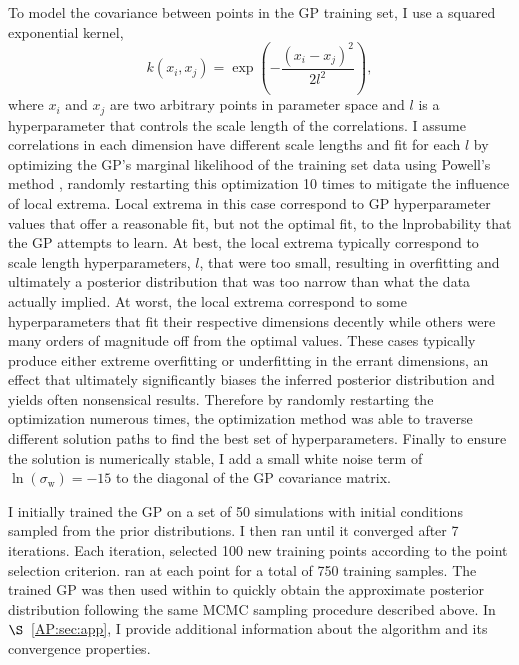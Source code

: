 To model the covariance between points in the GP training set, I use a squared exponential kernel,
\begin{equation} \label{trap:eqn:kernel}
k(x_i, x_j) = \exp \left( - \frac{(x_i - x_j)^2}{2l^2} \right),
\end{equation}
where $x_i$ and $x_j$ are two arbitrary points in parameter space and $l$ is a hyperparameter that controls the scale length of the correlations. I assume correlations in each dimension have different scale lengths and fit for each $l$ by optimizing the GP's marginal likelihood of the training set data using Powell's method \citep{Powell1964}, randomly restarting this optimization 10 times to mitigate the influence of local extrema. Local extrema in this case correspond to GP hyperparameter values that offer a reasonable fit, but not the optimal fit, to the lnprobability that the GP attempts to learn. At best, the local extrema typically correspond to scale length hyperparameters, $l$, that were too small, resulting in overfitting and ultimately a posterior distribution that was too narrow than what the data actually implied. At worst, the local extrema correspond to some hyperparameters that fit their respective dimensions decently while others were many orders of magnitude off from the optimal values. These cases typically produce either extreme overfitting or underfitting in the errant dimensions, an effect that ultimately significantly biases the inferred posterior distribution and yields often nonsensical results. Therefore by randomly restarting the optimization numerous times, the optimization method was able to traverse different solution paths to find the best set of hyperparameters. Finally to ensure the solution is numerically stable, I add a small white noise term of $\ln(\sigma_{\mathrm{w}}) = -15$ to the diagonal of the GP covariance matrix. 

I initially trained the GP on a set of 50 \vplanet simulations with initial conditions sampled from the prior distributions. I then ran \approxposterior until it converged after 7 iterations. Each iteration, \approxposterior selected 100 new training points according to the \citet{Kandasamy2017} point selection criterion. \approxposterior ran \vplanet at each point for a total of 750 training samples. The trained GP was then used within \emcee to quickly obtain the approximate posterior distribution following the same MCMC sampling procedure described above. In $\S$~\ref{AP:sec:app}, I provide additional information about the \approxposterior algorithm and its convergence properties.


